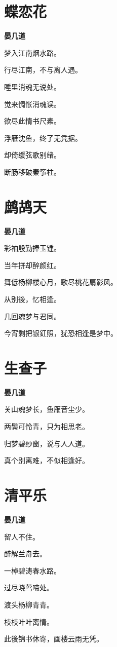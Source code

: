 \documentclass[12pt,a4paper]{ctexbook}
\begin{document}
\section{蝶恋花}
\textbf{晏几道}\par\vspace{0.5em}
梦入江南烟水路。\par
行尽江南，不与离人遇。\par
睡里消魂无说处。\par
觉来惆怅消魂误。\par
欲尽此情书尺素。\par
浮雁沈鱼，终了无凭据。\par
却倚缓弦歌别绪。\par
断肠移破秦筝柱。\par

\section{鹧鸪天}
\textbf{晏几道}\par\vspace{0.5em}
彩袖殷勤捧玉锺。\par
当年拼却醉颜红。\par
舞低杨柳楼心月，歌尽桃花扇影风。\par
从别後，忆相逢。\par
几回魂梦与君同。\par
今宵剩把银釭照，犹恐相逢是梦中。\par

\section{生查子}
\textbf{晏几道}\par\vspace{0.5em}
关山魂梦长，鱼雁音尘少。\par
两鬓可怜青，只为相思老。\par
归梦碧纱窗，说与人人道。\par
真个别离难，不似相逢好。\par

\section{清平乐}
\textbf{晏几道}\par\vspace{0.5em}
留人不住。\par
醉解兰舟去。\par
一棹碧涛春水路。\par
过尽晓莺啼处。\par
渡头杨柳青青。\par
枝枝叶叶离情。\par
此後锦书休寄，画楼云雨无凭。\par
\end{document}
